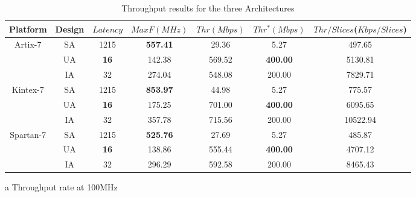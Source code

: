 \documentclass[final,5p,times,twocolumn]{elsarticle}
\begin{document}
\begin{table}
    \begin{threeparttable}
        \caption{Throughput results for the three Architectures}\label{throughput_compare}%
        \begin{tabular*}{\textwidth}{@{\extracolsep\fill}|c|c|c|c|c|c|c|}
            \hline
            Platform & Design & $Latency$ & $MaxF(MHz)$ & $Thr(Mbps)$ & $Thr^*(Mbps)$\tnote{a} & $Thr/Slices$($Kbps/Slices$) \\
            \hline
            \multirow{3}{*}{Artix-7}  & SA & 1215 & \textbf{557.41} & 29.36 & 5.27 & 497.65 \\
            & UA & \textbf{16} & 142.38 & 569.52 & \textbf{400.00} & 5130.81 \\
            & IA & 32 & 274.04 & 548.08 & 200.00 & 7829.71 \\
            \hline
            \multirow{3}{*}{Kintex-7} & SA & 1215 & \textbf{853.97} & 44.98 & 5.27 & 775.57 \\
            & UA & \textbf{16} & 175.25 & 701.00 & \textbf{400.00} & 6095.65 \\
            & IA & 32 & 357.78 & 715.56 & 200.00 & 10522.94 \\
            \hline
            \multirow{3}{*}{Spartan-7} & SA & 1215 & \textbf{525.76} & 27.69 & 5.27 & 485.87 \\
            & UA & \textbf{16} & 138.86 & 555.44 & \textbf{400.00} & 4707.12 \\
            & IA & 32 & 296.29 & 592.58 & 200.00 & 8465.43 \\
            \hline
        \end{tabular*}
        \begin{tablenotes}
            \item[a] Throughput rate at 100MHz
        \end{tablenotes}
    \end{threeparttable}
\end{table}
\end{document}
